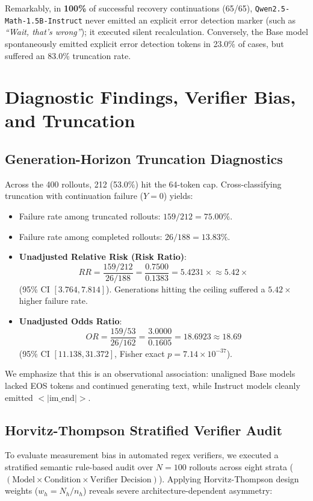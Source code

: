 \documentclass[conference]{IEEEtran}
\begin{document}
Remarkably, in \textbf{100\%} of successful recovery continuations (65/65), \texttt{Qwen2.5-Math-1.5B-Instruct} never emitted an explicit error detection marker (such as \textit{``Wait, that's wrong''}); it executed silent recalculation. Conversely, the Base model spontaneously emitted explicit error detection tokens in 23.0\% of cases, but suffered an 83.0\% truncation rate.

\section{Diagnostic Findings, Verifier Bias, and Truncation}

\subsection{Generation-Horizon Truncation Diagnostics}
Across the 400 rollouts, 212 (53.0\%) hit the 64-token cap. Cross-classifying truncation with continuation failure ($Y=0$) yields:
\begin{itemize}
    \item Failure rate among truncated rollouts: $159 / 212 = \mathbf{75.00\%}$.
    \item Failure rate among completed rollouts: $26 / 188 = \mathbf{13.83\%}$.
    \item \textbf{Unadjusted Relative Risk (Risk Ratio)}:
    \begin{equation}
    RR = \frac{159 / 212}{26 / 188} = \frac{0.7500}{0.1383} = \mathbf{5.4231\times} \approx \mathbf{5.42\times}
    \end{equation}
    (95\% CI $[3.764, 7.814]$). Generations hitting the ceiling suffered a $5.42\times$ higher failure rate.
    \item \textbf{Unadjusted Odds Ratio}:
    \begin{equation}
    OR = \frac{159 / 53}{26 / 162} = \frac{3.0000}{0.1605} = \mathbf{18.6923} \approx \mathbf{18.69}
    \end{equation}
    (95\% CI $[11.138, 31.372]$, Fisher exact $p = 7.14 \times 10^{-37}$).
\end{itemize}
We emphasize that this is an observational association: unaligned Base models lacked EOS tokens and continued generating text, while Instruct models cleanly emitted $<|\text{im\_end}|>$.

\subsection{Horvitz-Thompson Stratified Verifier Audit}
To evaluate measurement bias in automated regex verifiers, we executed a stratified semantic rule-based audit over $N=100$ rollouts across eight strata ($(\text{Model} \times \text{Condition} \times \text{Verifier Decision})$). Applying Horvitz-Thompson design weights ($w_h = N_h / n_h$) reveals severe architecture-dependent asymmetry:
\end{document}
